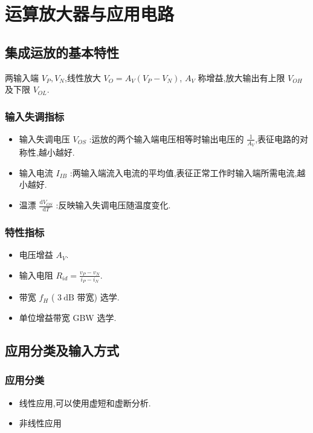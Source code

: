 
\usepackage{../../lectures_preamble}


    \section{运算放大器与应用电路}
        \subsection{集成运放的基本特性}
        两输入端 $V_{P},V_{N}$,线性放大 $V_{O}=A_{V}\left( V_{P}-V_{N} \right) $, $A_{V}$ 称增益,放大输出有上限 $V_{OH}$ 及下限 $V_{OL}$.
            \subsubsection{输入失调指标}
            \begin{itemize}
                \item 输入失调电压 $V_{OS}$ :运放的两个输入端电压相等时输出电压的 $\frac{1}{A_{V}}$,表征电路的对称性,越小越好.
                \item 输入电流 $I_{IB}$ :两输入端流入电流的平均值,表征正常工作时输入端所需电流,越小越好.
                \item 温漂 $\frac{\mathrm{d}V_{OS}}{\mathrm{d}T}$ :反映输入失调电压随温度变化.
            \end{itemize}
            \subsubsection{特性指标}
            \begin{itemize}
                \item 电压增益 $A_{V}$.
                \item 输入电阻 $R_{id}=\frac{v_{P}-v_{N}}{i_{P}-i_{N}}$.
                \item 带宽 $f_{H}$ ( $3 \ \mathrm{dB}$ 带宽) 选学.
                \item 单位增益带宽 GBW 选学.
            \end{itemize}
        \subsection{应用分类及输入方式}
            \subsubsection{应用分类}
            \begin{itemize}
                \item 线性应用,可以使用虚短和虚断分析.
                \item 非线性应用
            \end{itemize}
